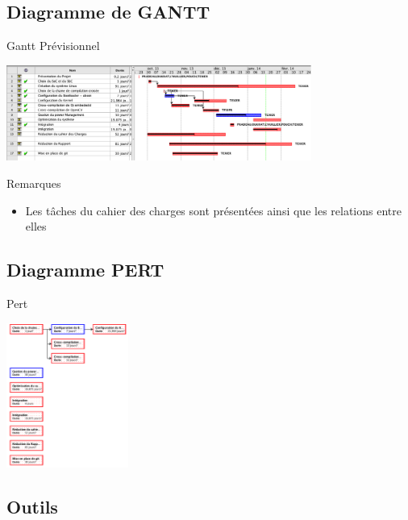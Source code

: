\documentclass[11pt]{beamer}
\begin{document}
	\subsection{Diagramme de GANTT}
	\begin{frame}{Gantt Prévisionnel}
		\begin{center}
			\includegraphics[width=10cm]{common/Gantt.png}
		\end{center}
				
		\begin{block}{Remarques}
			\begin{itemize}
			\item Les tâches du cahier des charges sont présentées ainsi que les relations entre elles
		\end{itemize}
		\end{block}
	\end{frame}
	
	
	\subsection{Diagramme PERT}
	\begin{frame}{Pert}
		\begin{center}
			\includegraphics[width=4cm]{common/pert.png}
		\end{center}
	\end{frame}
	
	
	\subsection{Outils}
\end{document}
